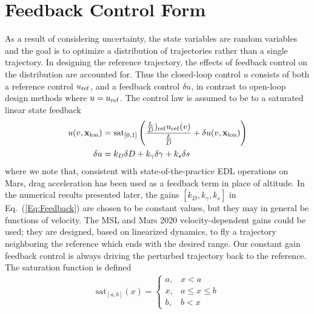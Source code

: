 \section{Feedback Control Form}
As a result of considering uncertainty, the state variables are random variables and the goal is to optimize a distribution of trajectories rather than a single trajectory.
In designing the reference trajectory, the effects of feedback control on the distribution are accounted for. Thus the closed-loop control $u$ consists of both a reference control $u_{\mathrm{ref}}$, and a feedback control $\delta u$, in contrast to open-loop design methods where $u=u_{\mathrm{ref}}$. 
The control law is assumed to be to a saturated linear state feedback 
\begin{align}
	u(v,\mathbf{x}_{\mathrm{lon}}) &= \mathrm{sat}_{[0,1]}\left(\frac{\frac{L}{D})_{\mathrm{ref}}u_{\mathrm{ref}}(v)}{\frac{L}{D}} + \delta u(v,\mathbf{x}_{\mathrm{lon}})\right) \label{Eq:Control}\\
	\delta u &= k_D\delta D + k_{\gamma}\delta\gamma + k_s\delta s \label{Eq:Feedback}
\end{align}
where we note that, consistent with state-of-the-practice EDL operations on Mars, drag acceleration has been used as a feedback term in place of altitude. 
In the numerical results presented later, the gains $[k_D, k_{\gamma}, k_s]$ in Eq.~(\ref{Eq:Feedback}) are chosen to be constant values, but they may in general be functions of velocity. 
The MSL and Mars 2020 velocity-dependent gains could be used; they are designed, based on linearized dynamics, to fly a trajectory neighboring the reference which ends with the desired range. Our constant gain feedback control is always driving the perturbed trajectory back to the reference. %
The saturation function is defined
\begin{align*}
	\mathrm{sat}_{[a,b]}(x) = \left\{\begin{array}{lc}
		a, &  x < a\\
		x, &  a\le x \le b\\
		b, &  b < x
	\end{array} \right. %
\end{align*}
